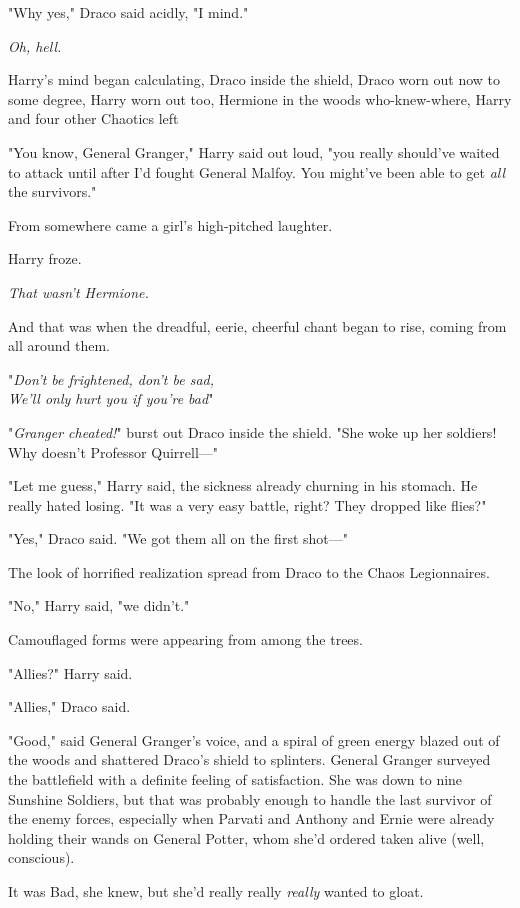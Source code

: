 "Why yes," Draco said acidly, "I mind."

\emph{Oh, hell.}

Harry's mind began calculating, Draco inside the shield, Draco worn out now to
some degree, Harry worn out too, Hermione in the woods who-knew-where, Harry
and four other Chaotics left{\el}

"You know, General Granger," Harry said out loud, "you really should've waited
to attack until after I'd fought General Malfoy. You might've been able to get
\emph{all} the survivors."

From somewhere came a girl's high-pitched laughter.

Harry froze.

\emph{That wasn't Hermione.}

And that was when the dreadful, eerie, cheerful chant began to rise, coming
from all around them.

"\emph{Don't be frightened, don't be sad,\\
We'll only hurt you if you're bad{\el}}"

"\emph{Granger cheated!}" burst out Draco inside the shield. "She woke up her
soldiers! Why doesn't Professor Quirrell\mbox{---}"

"Let me guess," Harry said, the sickness already churning in his stomach. He
really hated losing. "It was a very easy battle, right? They dropped like
flies?"

"Yes," Draco said. "We got them all on the first shot\mbox{---}"

The look of horrified realization spread from Draco to the Chaos Legionnaires.

"No," Harry said, "we didn't."

Camouflaged forms were appearing from among the trees.

"Allies?" Harry said.

"Allies," Draco said.

"Good," said General Granger's voice, and a spiral of green energy blazed out
of the woods and shattered Draco's shield to splinters.
\sbreak
General Granger surveyed the battlefield with a definite feeling of
satisfaction. She was down to nine Sunshine Soldiers, but that was probably
enough to handle the last survivor of the enemy forces, especially when Parvati
and Anthony and Ernie were already holding their wands on General Potter, whom
she'd ordered taken alive (well, conscious).

It was Bad, she knew, but she'd really really \emph{really} wanted to gloat.

